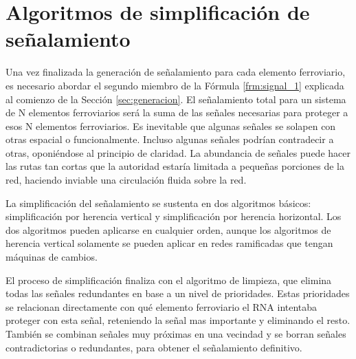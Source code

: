 \section{Algoritmos de simplificación de señalamiento}
    \label{sec:simplificacion}

    
    Una vez finalizada la generación de señalamiento para cada elemento ferroviario, es necesario abordar el segundo miembro de la Fórmula \ref{frm:signal_1} explicada al comienzo de la Sección \ref{sec:generacion}. El señalamiento total para un sistema de N elementos ferroviarios será la suma de las señales necesarias para proteger a esos N elementos ferroviarios. Es inevitable que algunas señales se solapen con otras espacial o funcionalmente. Incluso algunas señales podrían contradecir a otras, oponiéndose al principio de claridad. La abundancia de señales puede hacer las rutas tan cortas que la autoridad estaría limitada a pequeñas porciones de la red, haciendo inviable una circulación fluida sobre la red.

    La simplificación del señalamiento se sustenta en dos algoritmos básicos: simplificación por herencia vertical y simplificación por herencia horizontal. Los dos algoritmos pueden aplicarse en cualquier orden, aunque los algoritmos de herencia vertical solamente se pueden aplicar en redes ramificadas que tengan máquinas de cambios. 

    El proceso de simplificación finaliza con el algoritmo de limpieza, que elimina todas las señales redundantes en base a un nivel de prioridades. Estas prioridades se relacionan directamente con qué elemento ferroviario el RNA intentaba proteger con esta señal, reteniendo la señal mas importante y eliminando el resto. También se combinan señales muy próximas en una vecindad y se borran señales contradictorias o redundantes, para obtener el señalamiento definitivo.    

 	
    
    